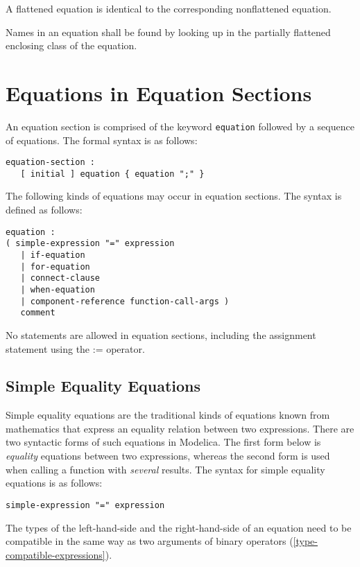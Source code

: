 A flattened equation is identical to the corresponding nonflattened
equation.

Names in an equation shall be found by looking up in the partially
flattened enclosing class of the equation.

\section{Equations in Equation Sections}\label{equations-in-equation-sections}

An equation section is comprised of the keyword \lstinline!equation! followed by a sequence of equations.
The formal syntax is as follows:
\begin{lstlisting}[language=grammar]
equation-section :
   [ initial ] equation { equation ";" }
\end{lstlisting}

The following kinds of equations may occur in equation sections. The
syntax is defined as follows:
\begin{lstlisting}[language=grammar]
equation :
( simple-expression "=" expression
   | if-equation
   | for-equation
   | connect-clause
   | when-equation
   | component-reference function-call-args )
   comment
\end{lstlisting}
No statements are allowed in equation sections, including the assignment
statement using the := operator.

\subsection{Simple Equality Equations}\label{simple-equality-equations}

Simple equality equations are the traditional kinds of equations known
from mathematics that express an equality relation between two
expressions. There are two syntactic forms of such equations in
Modelica. The first form below is \emph{equality} equations between two
expressions, whereas the second form is used when calling a function
with \emph{several} results. The syntax for simple equality equations is
as follows:
\begin{lstlisting}[language=grammar]
simple-expression "=" expression
\end{lstlisting}
The types of the left-hand-side and the right-hand-side of an equation
need to be compatible in the same way as two arguments of binary
operators (\cref{type-compatible-expressions}).

